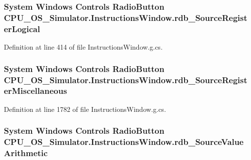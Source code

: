 \subsubsection[{rdb\+\_\+\+Source\+Register\+Logical}]{\setlength{\rightskip}{0pt plus 5cm}System Windows Controls Radio\+Button C\+P\+U\+\_\+\+O\+S\+\_\+\+Simulator.\+Instructions\+Window.\+rdb\+\_\+\+Source\+Register\+Logical\hspace{0.3cm}{\ttfamily [package]}}\label{class_c_p_u___o_s___simulator_1_1_instructions_window_ab8c8622e8a96238fb88e455d60c51e78}


Definition at line 414 of file Instructions\+Window.\+g.\+cs.

\hypertarget{class_c_p_u___o_s___simulator_1_1_instructions_window_ad2b0098ef721214b53b9e3241e611a84}{}
\subsubsection[{rdb\+\_\+\+Source\+Register\+Miscellaneous}]{\setlength{\rightskip}{0pt plus 5cm}System Windows Controls Radio\+Button C\+P\+U\+\_\+\+O\+S\+\_\+\+Simulator.\+Instructions\+Window.\+rdb\+\_\+\+Source\+Register\+Miscellaneous\hspace{0.3cm}{\ttfamily [package]}}\label{class_c_p_u___o_s___simulator_1_1_instructions_window_ad2b0098ef721214b53b9e3241e611a84}


Definition at line 1782 of file Instructions\+Window.\+g.\+cs.

\hypertarget{class_c_p_u___o_s___simulator_1_1_instructions_window_a627e9cbe7e0cb2ce0f109f2345e19b73}{}
\subsubsection[{rdb\+\_\+\+Source\+Value\+Arithmetic}]{\setlength{\rightskip}{0pt plus 5cm}System Windows Controls Radio\+Button C\+P\+U\+\_\+\+O\+S\+\_\+\+Simulator.\+Instructions\+Window.\+rdb\+\_\+\+Source\+Value\+Arithmetic\hspace{0.3cm}{\ttfamily [package]}}\label{class_c_p_u___o_s___simulator_1_1_instructions_window_a627e9cbe7e0cb2ce0f109f2345e19b73}


